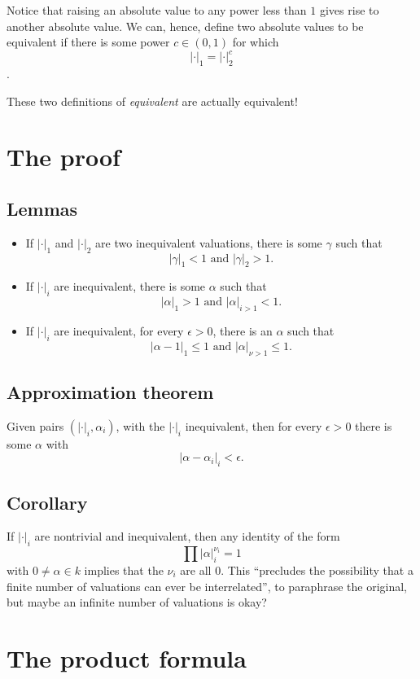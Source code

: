 Notice that raising an absolute value to any power less than $1$ gives rise to
another absolute value. We can, hence, define two absolute values to be
equivalent if there is some power $c\in(0,1)$ for which
\[|\cdot|_1 = |\cdot|_2^c\].

These two definitions of \textit{equivalent} are actually equivalent!


\section{The proof}
\subsection{Lemmas}
\label{sec:orgheadline3}
\begin{itemize}
\item If \(|\cdot|_1\) and \(|\cdot|_2\) are two inequivalent valuations, there is some \(\gamma\) such that \[|\gamma|_1 < 1 \text{ and } |\gamma|_2 > 1.\]
\item If \(|\cdot|_i\) are inequivalent, there is some \(\alpha\) such that \[|\alpha|_1 > 1\text{ and }|\alpha|_{i>1} < 1.\]
\item If \(|\cdot|_i\) are inequivalent, for every \(\epsilon>0\), there is an \(\alpha\) such that \[|\alpha-1|_1 \leq 1 \text{ and } |\alpha|_{\nu>1}\leq 1.\]
\end{itemize}
\subsection{Approximation theorem}
\label{sec:orgheadline4}
Given pairs \((|\cdot|_i, \alpha_i)\), with the \(|\cdot|_i\) inequivalent, then for every \(\epsilon>0\) there is some \(\alpha\) with 
\[|\alpha - \alpha_i|_i < \epsilon.\]
\subsection{Corollary}
\label{sec:orgheadline5}
If \(|\cdot|_i\) are nontrivial and inequivalent, then any identity of the form
\[\prod |\alpha|_{i}^{\nu_i} = 1\]
with \(0\neq \alpha\in k\) implies that the \(\nu_i\) are all \(0\).
This ``precludes the possibility that a finite number of valuations can ever be interrelated'', to paraphrase the original, but maybe an infinite number of valuations is okay?
\section{The product formula}
\label{sec:orgheadline26}
